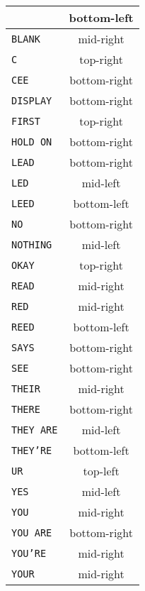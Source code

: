 \documentclass[11pt]{amsart}
\begin{document}
\begin{tabular}{|l|c|}
\hline
\texttt{}         & bottom-left  \\ \hline
\texttt{BLANK}    & mid-right    \\ \hline
\texttt{C}        & top-right    \\ \hline
\texttt{CEE}      & bottom-right \\ \hline
\texttt{DISPLAY}  & bottom-right \\ \hline
\texttt{FIRST}    & top-right    \\ \hline
\texttt{HOLD ON}  & bottom-right \\ \hline
\texttt{LEAD}     & bottom-right \\ \hline
\texttt{LED}      & mid-left     \\ \hline
\texttt{LEED}     & bottom-left  \\ \hline
\texttt{NO}       & bottom-right \\ \hline
\texttt{NOTHING}  & mid-left     \\ \hline
\texttt{OKAY}     & top-right    \\ \hline
\texttt{READ}     & mid-right    \\ \hline
\texttt{RED}      & mid-right    \\ \hline
\texttt{REED}     & bottom-left  \\ \hline
\texttt{SAYS}     & bottom-right \\ \hline
\texttt{SEE}      & bottom-right \\ \hline
\texttt{THEIR}    & mid-right    \\ \hline
\texttt{THERE}    & bottom-right \\ \hline
\texttt{THEY ARE} & mid-left     \\ \hline
\texttt{THEY'RE}  & bottom-left  \\ \hline
\texttt{UR}       & top-left     \\ \hline
\texttt{YES}      & mid-left     \\ \hline
\texttt{YOU}      & mid-right    \\ \hline
\texttt{YOU ARE}  & bottom-right \\ \hline
\texttt{YOU'RE}   & mid-right    \\ \hline
\texttt{YOUR}     & mid-right    \\ \hline
\end{tabular}
\end{document}
